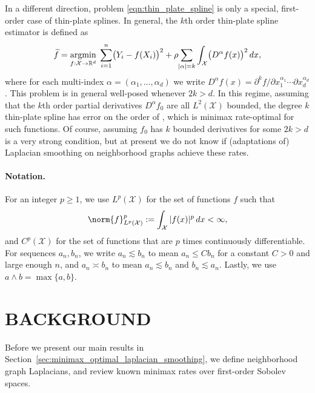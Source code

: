 \documentclass[twoside]{article}
\newcommand{\Reals}{\mathbb{R}}
\newcommand{\1}{\mathbf{1}}
\DeclareMathOperator*{\argmin}{argmin}
\newcommand{\Rd}{\Reals^d}
\newcommand{\Xset}{\mathcal{X}}
\newcommand{\Leb}{L}
\newcommand{\wt}[1]{\widetilde{#1}}
\theoremstyle{definition}
\theoremstyle{remark}
\begin{document}
In a different direction, problem \eqref{eqn:thin_plate_spline} is only a special, first-order case of thin-plate splines. In general, the $k$th order thin-plate spline estimator is defined as
\begin{equation*}
\wt{f} = \argmin_{f : \Xset \to \Rd} \; \sum_{i = 1}^{n} \bigl(Y_i - f(X_i)\bigr)^2 + \rho \hspace{-2pt} \sum_{|\alpha| = k} \int_{\Xset} \bigl(D^\alpha f(x)\bigr)^2 \,dx,
\end{equation*}
where for each multi-index $\alpha=(\alpha_1,\ldots,\alpha_d)$ we write $D^\alpha f(x) = \partial^kf/\partial x_{1}^{\alpha_1} \cdots \partial x_{d}^{\alpha_d}$. This problem is in general well-posed whenever $2k > d$. In this regime, assuming that the $k$th order partial derivatives $D^\alpha f_0$ are all $\Leb^2(\Xset)$ bounded, the degree $k$ thin-plate spline has error on the order of  \citep{vandergeer2000}, which is minimax rate-optimal for such functions. Of course, assuming $f_0$ has $k$ bounded derivatives for some $2k > d$ is a very strong condition, but at present we do not know if (adaptations of) Laplacian smoothing on neighborhood graphs achieve these rates.

\paragraph{Notation.}

For an integer $p \geq 1$, we use $\Leb^p(\Xset)$ for the set of functions $f$ such that 
\begin{equation*}
\norm{f}_{\Leb^p(\Xset)}^p := \int_{\Xset} |f(x)|^p \,dx < \infty,
\end{equation*}
and $C^p(\Xset)$ for the set of functions that are $p$ times continuously differentiable. For sequences $a_n,b_n$, we write $a_n \lesssim b_n$ to mean $a_n \leq Cb_n$ for a constant $C>0$ and large enough $n$, and $a_n \asymp b_n$ to mean $a_n \lesssim b_n$ and $b_n \lesssim a_n$. Lastly, we use $a \wedge b = \max\{a,b\}$. 

\section{BACKGROUND}
\label{sec:problem_setup_and_background}

Before we present our main results in Section~\ref{sec:minimax_optimal_laplacian_smoothing}, we define neighborhood graph Laplacians, and review known minimax rates over first-order Sobolev spaces.
\end{document}

